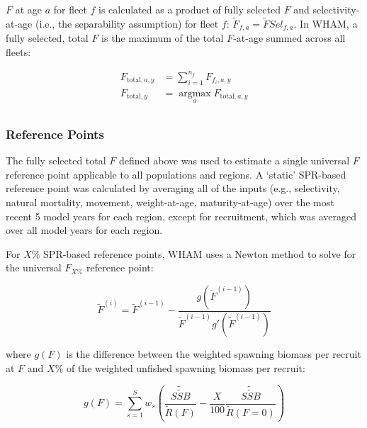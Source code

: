 \documentclass[
  12pt,
]{article}
\begin{document}
\({F}\) at age \({a}\) for fleet \({f}\) is calculated as a product of
fully selected \({F}\) and selectivity-at-age (i.e., the separability
assumption) for fleet \({f}\):
\(\tilde F_{f,a} = \tilde F \textit{Sel}_{f,a}\). In WHAM, a fully
selected, total \({F}\) is the maximum of the total \({F}\)-at-age
summed across all fleets:

\begin{equation}
\begin{aligned}
F_{\text{total},a,y} &= \sum_{i=1}^{n_f} F_{f_i,a,y} \\
F_{\text{total},y} &= \operatorname*{argmax}_a F_{\text{total},a,y} \\
\end{aligned}
\end{equation}

\hypertarget{reference-points}{%
\subsubsection*{Reference Points}\label{reference-points}}

The fully selected total \(F\) defined above was used to estimate a
single universal \({F}\) reference point applicable to all populations
and regions. A `static' SPR-based reference point was calculated by
averaging all of the inputs (e.g., selectivity, natural mortality,
movement, weight-at-age, maturity-at-age) over the most recent 5 model
years for each region, except for recruitment, which was averaged over
all model years for each region.

For \(X\%\) SPR-based reference points, WHAM uses a Newton method to
solve for the universal \(F_{X\%}\) reference point:

\begin{equation}
\tilde{F}^{(i)} = \tilde{F}^{(i-1)} - \frac{g\left(\tilde{F}^{(i-1)}\right)}{\tilde{F}^{(i-1)}g'\left(\tilde{F}^{(i-1)}\right)}
\end{equation}

where \(g(F)\) is the difference between the weighted spawning biomass
per recruit at \(F\) and \(X\%\) of the weighted unfished spawning
biomass per recruit:

\begin{equation}
g(F) = \sum_{s=1}^S w_s \left( \frac{\tilde{\tilde{SSB}}}{\tilde{R}(F)} - \frac{X}{100} \frac{\tilde{\tilde{SSB}}}{\tilde{R}(F=0)} \right)
\end{equation}
\end{document}
